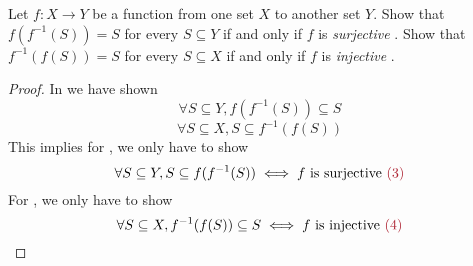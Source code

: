 \begin{exercise} \label{exercise 3.4.5}
Let \(f : X \to Y\) be a function from one set \(X\) to another set \(Y\).
Show that \(f(f^{-1}(S)) = S\) for every \(S \subseteq Y\) if and only if \(f\) is \emph{surjective} .
Show that \(f^{-1}(f(S)) = S\) for every \(S \subseteq X\) if and only if \(f\) is \emph{injective} .
\end{exercise}

\begin{proof}
In  we have shown
\[\forall S \subseteq Y, f(f^{-1}(S)) \subseteq S\]
\[\forall S \subseteq X, S \subseteq f^{-1}(f(S))\]
This implies for , we only have to show
\[\forall S \subseteq Y, S \subseteq f(f^{-1}(S)) \iff f \text{\ is surjective \MAROON{(3)}}\]
For , we only have to show
\[\forall S \subseteq X, f^{-1}(f(S)) \subseteq S \iff f \text{\ is injective \MAROON{(4)}}\]


\end{proof}
